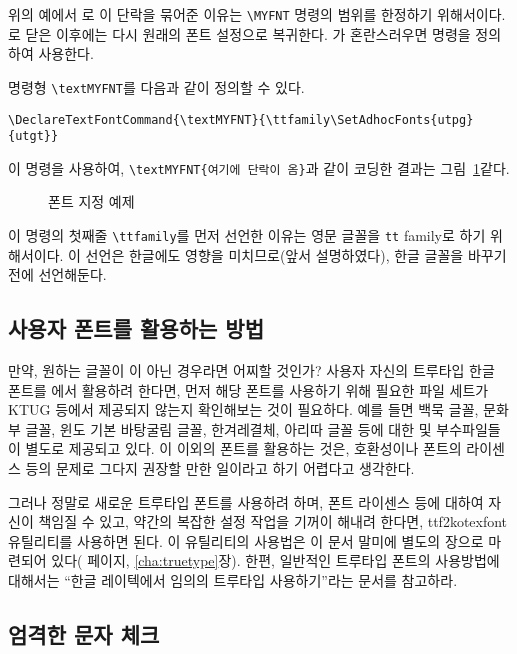 위의 예에서 로 이 단락을 묶어준 이유는 \verb|\MYFNT|
명령의 범위를 한정하기 위해서이다. 로 닫은 이후에는
다시 원래의 폰트 설정으로 복귀한다. 가 혼란스러우면
 명령을 정의하여 사용한다.

명령형 \verb|\textMYFNT|를 다음과 같이 정의할 수 있다.
\begin{Verbatim}[fontsize=\small]
\DeclareTextFontCommand{\textMYFNT}{\ttfamily\SetAdhocFonts{utpg}{utgt}}
\end{Verbatim}
이 명령을 사용하여, \verb|\textMYFNT{여기에 단락이 옴}|과 같이
코딩한 결과는 그림~\ref{fig:paratest}\과 같다.

\begin{figure}[ht]
\begin{framed}
\centering{}
\end{framed}
\caption{폰트 지정 예제}\label{fig:paratest}
\end{figure}

이 명령의 첫째줄 \verb|\ttfamily|를 먼저 선언한 이유는 영문 글꼴을
\texttt{tt} family로 하기 위해서이다. 이 선언은 한글에도 영향을
미치므로(앞서 설명하였다), 한글 글꼴을 바꾸기 전에 선언해둔다.

\subsection{사용자 폰트를 활용하는 방법}

만약, 원하는 글꼴이 이 아닌 경우라면 어찌할 것인가?
사용자 자신의 트루타입 한글 폰트를 \thispkg 에서 활용하려 한다면,
먼저 해당 폰트를 사용하기 위해 필요한 파일 세트가 KTUG 등에서 제공되지
않는지 확인해보는 것이 필요하다. 예를 들면 백묵 글꼴, 문화부 글꼴,
윈도 기본 바탕\cntrdot 굴림 글꼴,
한겨레결체, 아리따 글꼴 등에 대한  및 부수파일들이
별도로 제공되고 있다. 이 이외의 폰트를 활용하는 것은, 호환성이나
폰트의 라이센스 등의 문제로 그다지 권장할 만한 일이라고 하기 어렵다고 생각한다.

그러나 정말로 새로운 트루타입 폰트를 사용하려 하며, 폰트 라이센스 등에 대하여
자신이 책임질 수 있고, 약간의 복잡한 설정 작업을
기꺼이 해내려 한다면, \textsf{ttf2kotexfont} 유틸리티를 사용하면
된다. 이 유틸리티의 사용법은 이 문서 말미에 별도의 장으로 마련되어 있다(\pageref{cha:truetype} 페이지, \ref{cha:truetype}장).
한편, 일반적인 트루타입 폰트의 사용방법에 대해서는 ``한글 레이텍에서
임의의 트루타입 사용하기''\cite{karnes2007b}라는
문서를 참고하라.

\subsection{엄격한 문자 체크}

